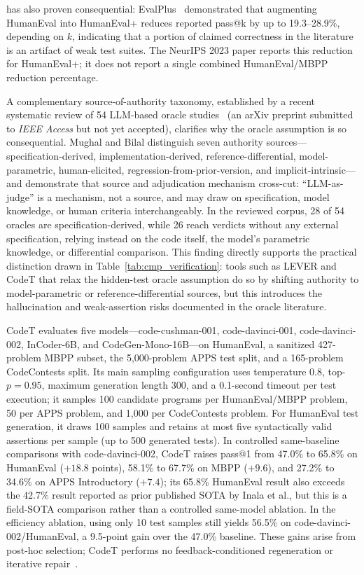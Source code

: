 \documentclass[10pt,a4paper]{article}
\begin{document}
has also proven consequential: EvalPlus~\cite{liu2023evalplus} demonstrated that augmenting HumanEval into HumanEval+ reduces reported pass@k by up to 19.3--28.9\%, depending on $k$, indicating that a portion of claimed correctness in the literature is an artifact of weak test suites. The NeurIPS 2023 paper reports this reduction for HumanEval+; it does not report a single combined HumanEval/MBPP reduction percentage.

A complementary source-of-authority taxonomy, established by a recent systematic review of 54 LLM-based oracle studies~\cite{mughal2026oracle} (an arXiv preprint submitted to \textit{IEEE Access} but not yet accepted), clarifies why the oracle assumption is so consequential. Mughal and Bilal distinguish seven authority sources---specification-derived, implementation-derived, reference-differential, model-parametric, human-elicited, regression-from-prior-version, and implicit-intrinsic---and demonstrate that source and adjudication mechanism cross-cut: ``LLM-as-judge'' is a mechanism, not a source, and may draw on specification, model knowledge, or human criteria interchangeably. In the reviewed corpus, 28 of 54 oracles are specification-derived, while 26 reach verdicts without any external specification, relying instead on the code itself, the model's parametric knowledge, or differential comparison. This finding directly supports the practical distinction drawn in Table~\ref{tab:cmp_verification}: tools such as LEVER and CodeT that relax the hidden-test oracle assumption do so by shifting authority to model-parametric or reference-differential sources, but this introduces the hallucination and weak-assertion risks documented in the oracle literature.

CodeT evaluates five models---code-cushman-001, code-davinci-001, code-davinci-002, InCoder-6B, and CodeGen-Mono-16B---on HumanEval, a sanitized 427-problem MBPP subset, the 5,000-problem APPS test split, and a 165-problem CodeContests split. Its main sampling configuration uses temperature 0.8, top-$p=0.95$, maximum generation length 300, and a 0.1-second timeout per test execution; it samples 100 candidate programs per HumanEval/MBPP problem, 50 per APPS problem, and 1,000 per CodeContests problem. For HumanEval test generation, it draws 100 samples and retains at most five syntactically valid assertions per sample (up to 500 generated tests). In controlled same-baseline comparisons with code-davinci-002, CodeT raises pass@1 from 47.0\% to 65.8\% on HumanEval ($+18.8$ points), 58.1\% to 67.7\% on MBPP ($+9.6$), and 27.2\% to 34.6\% on APPS Introductory ($+7.4$); its 65.8\% HumanEval result also exceeds the 42.7\% result reported as prior published SOTA by Inala et al., but this is a field-SOTA comparison rather than a controlled same-model ablation. In the efficiency ablation, using only 10 test samples still yields 56.5\% on code-davinci-002/HumanEval, a 9.5-point gain over the 47.0\% baseline. These gains arise from post-hoc selection; CodeT performs no feedback-conditioned regeneration or iterative repair~\cite{chenbei2023}.
\end{document}
